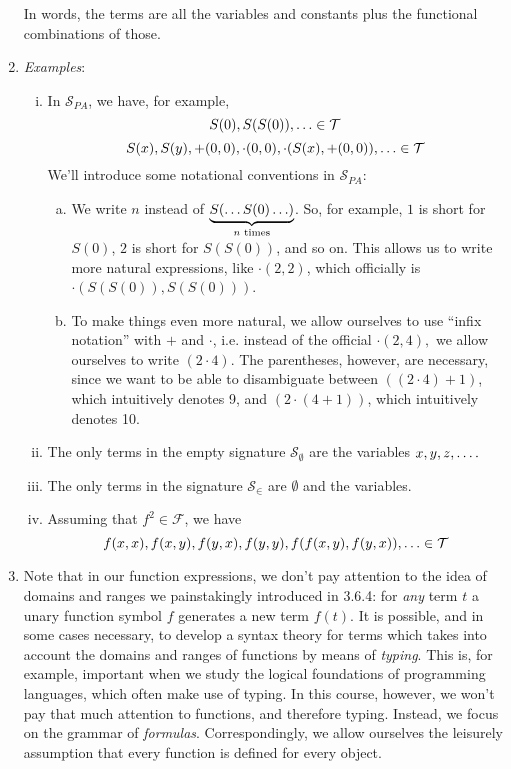 \begin{enumerate}[\thesection.1]
\begin{enumerate}[(i)]
		\end{enumerate}
		In words, the terms are all the variables and constants plus the functional combinations of those. 
		
		\item \emph{Examples}:
		
			\begin{enumerate}[(i)]
			
				\item In $\mathcal{S}_{PA}$, we have, for example, \[S(0),S(S(0)),\mathellipsis\in\mathcal{T}\]\[S(x), S(y), +(0,0), \cdot(0,0), \cdot (S(x), +(0,0)),\mathellipsis\in\mathcal{T}\]	
				We'll introduce some notational conventions in $\mathcal{S}_{PA}$: 
				\begin{enumerate}[(a)]
					
					\item We write ${n}$ instead of $\underbrace{S(\mathellipsis S(0)\mathellipsis)}_{n\text{ times}}$. So, for example, ${1}$ is short for $S(0)$, ${2}$ is short for $S(S(0))$, and so on. This allows us to write more natural expressions, like $\cdot ({2},{2})$, which officially is $\cdot(S(S(0)),S(S(0)))$.
					
					\item To make things even more natural, we allow ourselves to use ``infix notation'' with $+$ and $\cdot$, i.e. instead of the official $\cdot(2,4),$ we allow ourselves to write $(2\cdot 4)$. The parentheses, however, are necessary, since we want to be able to disambiguate between $((2\cdot 4)+1)$, which intuitively denotes 9, and $(2\cdot (4+1))$, which intuitively denotes 10.
				
				\end{enumerate}
			
				\item The only terms in the empty signature $\mathcal{S}_\emptyset$ are the variables $x,y,z,\mathellipsis.$
				
				\item The only terms in the signature $\mathcal{S}_\in$ are $\emptyset$ and the variables. 
				
				\item Assuming that $f^2\in\mathcal{F}$, we have \[f(x,x), f(x,y), f(y,x), f(y,y), f(f(x,y), f(y,x)),\mathellipsis\in\mathcal{T}\]
			\end{enumerate}
					
		\item Note that in our function expressions, we don't pay attention to the idea of domains and ranges we painstakingly introduced in 3.6.4: for \emph{any} term $t$ a unary function symbol $f$ generates a new term $f(t)$. It is possible, and in some cases necessary, to develop a syntax theory for terms which takes into account the domains and ranges of functions by means of \emph{typing}. This is, for example, important when we study the logical foundations of programming languages, which often make use of typing. In this course, however, we won't pay that much attention to functions, and therefore typing. Instead, we focus on the grammar of \emph{formulas}. Correspondingly, we allow ourselves the leisurely assumption that every function is defined for every object.
		

\end{enumerate}
